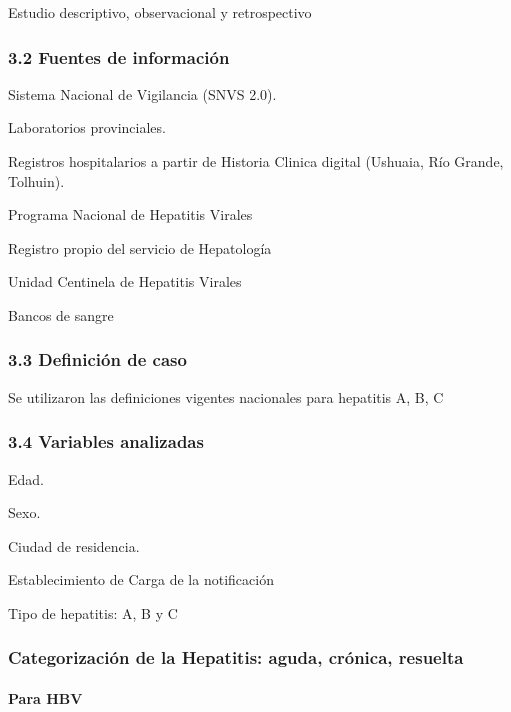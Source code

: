 \documentclass[
  letterpaper,
  DIV=11,
  numbers=noendperiod]{scrartcl}
\let\oldparagraph\paragraph
\renewcommand{\paragraph}[1]{\oldparagraph{#1}\mbox{}}
\begin{document}
Estudio descriptivo, observacional y retrospectivo

\hypertarget{fuentes-de-informaciuxf3n}{%
\subsubsection{3.2 Fuentes de
información}\label{fuentes-de-informaciuxf3n}}

Sistema Nacional de Vigilancia (SNVS 2.0).

Laboratorios provinciales.

Registros hospitalarios a partir de Historia Clinica digital (Ushuaia,
Río Grande, Tolhuin).

Programa Nacional de Hepatitis Virales

Registro propio del servicio de Hepatología

Unidad Centinela de Hepatitis Virales

Bancos de sangre

\hypertarget{definiciuxf3n-de-caso}{%
\subsubsection{3.3 Definición de caso}\label{definiciuxf3n-de-caso}}

Se utilizaron las definiciones vigentes nacionales para hepatitis A, B,
C

\hypertarget{variables-analizadas}{%
\subsubsection{3.4 Variables analizadas}\label{variables-analizadas}}

Edad.

Sexo.

Ciudad de residencia.

Establecimiento de Carga de la notificación

Tipo de hepatitis: A, B y C

\hypertarget{categorizaciuxf3n-de-la-hepatitis-aguda-cruxf3nica-resuelta}{%
\subsubsection{Categorización de la Hepatitis: aguda, crónica,
resuelta}\label{categorizaciuxf3n-de-la-hepatitis-aguda-cruxf3nica-resuelta}}

\hypertarget{para-hbv}{%
\paragraph{Para HBV}\label{para-hbv}}
\end{document}
